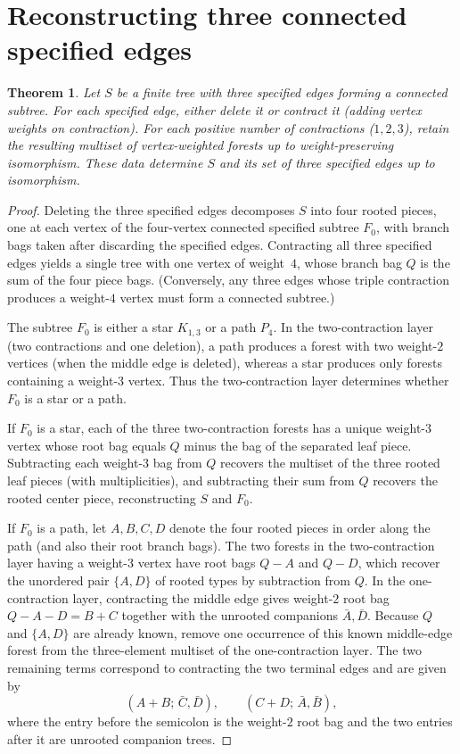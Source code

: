 \documentclass[10pt]{article}
\newtheorem{theorem}{Theorem}[section]
\begin{document}
\section{Reconstructing three connected specified edges}

\begin{theorem}\label{thm:three-edge}
Let $S$ be a finite tree with three specified edges forming a connected subtree. For each specified edge, either delete it or contract it (adding vertex weights on contraction). For each positive number of contractions ($1,2,3$), retain the resulting multiset of vertex-weighted forests up to weight-preserving isomorphism. These data determine $S$ and its set of three specified edges up to isomorphism.
\end{theorem}

\begin{proof}
Deleting the three specified edges decomposes $S$ into four rooted pieces, one at each vertex of the four-vertex connected specified subtree $F_0$, with branch bags taken after discarding the specified edges. Contracting all three specified edges yields a single tree with one vertex of weight~$4$, whose branch bag $Q$ is the sum of the four piece bags. (Conversely, any three edges whose triple contraction produces a weight-$4$ vertex must form a connected subtree.)

The subtree $F_0$ is either a star $K_{1,3}$ or a path $P_4$. In the two-contraction layer (two contractions and one deletion), a path produces a forest with two weight-$2$ vertices (when the middle edge is deleted), whereas a star produces only forests containing a weight-$3$ vertex. Thus the two-contraction layer determines whether $F_0$ is a star or a path.

If $F_0$ is a star, each of the three two-contraction forests has a unique weight-$3$ vertex whose root bag equals $Q$ minus the bag of the separated leaf piece. Subtracting each weight-$3$ bag from $Q$ recovers the multiset of the three rooted leaf pieces (with multiplicities), and subtracting their sum from $Q$ recovers the rooted center piece, reconstructing $S$ and $F_0$.

If $F_0$ is a path, let $A,B,C,D$ denote the four rooted pieces in order along the path (and also their root branch bags). The two forests in the two-contraction layer having a weight-$3$ vertex have root bags $Q-A$ and $Q-D$, which recover the unordered pair $\{A,D\}$ of rooted types by subtraction from $Q$. In the one-contraction layer, contracting the middle edge gives weight-$2$ root bag $Q-A-D=B+C$ together with the unrooted companions $\bar A,\bar D$. Because $Q$ and $\{A,D\}$ are already known, remove one occurrence of this known middle-edge forest from the three-element multiset of the one-contraction layer. The two remaining terms correspond to contracting the two terminal edges and are given by
\[
(A+B;\, \bar C,\bar D),\qquad (C+D;\, \bar A,\bar B),
\]
where the entry before the semicolon is the weight-$2$ root bag and the two entries after it are unrooted companion trees.


\end{proof}
\end{document}
